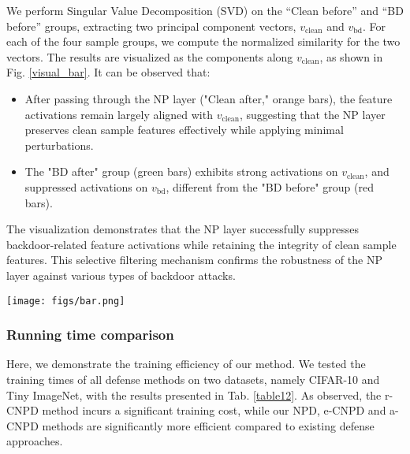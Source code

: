 We perform Singular Value Decomposition (SVD) \cite{stewart1993early} on the “Clean before” and “BD before” groups, extracting two principal component vectors, \( v_{\text{clean}} \) and \( v_{\text{bd}} \). For each of the four sample groups, we compute the normalized similarity for the two vectors. The results are visualized as the components along \( v_{\text{clean}} \), as shown in Fig. \ref{visual_bar}. It can be observed that:  
\begin{itemize}
    \item After passing through the NP layer ("Clean after," orange bars), the feature activations remain largely aligned with \( v_{\text{clean}} \), suggesting that the NP layer preserves clean sample features effectively while applying minimal perturbations.
    \item The "BD after" group (green bars) exhibits strong activations on \( v_{\text{clean}} \), and suppressed activations on \( v_{\text{bd}} \), different from the "BD before" group (red bars).
\end{itemize}
The visualization demonstrates that the NP layer successfully suppresses backdoor-related feature activations while retaining the integrity of clean sample features. This selective filtering mechanism confirms the robustness of the NP layer against various types of backdoor attacks.


\begin{figure*}[h]
    \centering
    \texttt{[image: figs/bar.png]}
    \caption{Visualization of clean and poisoned samples with and without the neural polarizer layer on CIFAR-10 dataset.}
    \label{visual_bar}
\end{figure*}



\subsubsection{Running time comparison}
Here, we demonstrate the training efficiency of our method. We tested the training times of all defense methods on two datasets, namely CIFAR-10 and Tiny ImageNet, with the results presented in Tab. \ref{table12}. As observed, the r-CNPD method incurs a significant training cost, while our NPD, e-CNPD and a-CNPD methods are significantly more efficient compared to existing defense approaches.






